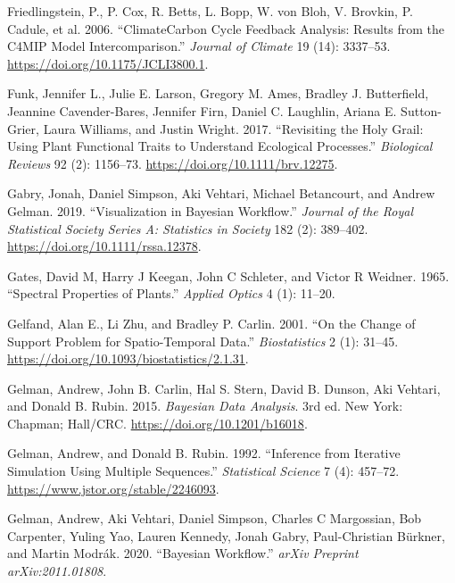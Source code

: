 \documentclass[
  letterpaper,
  DIV=11,
  numbers=noendperiod]{scrartcl}
\newlength{\cslhangindent}
\newlength{\cslentryspacingunit} %
\newenvironment{CSLReferences}[2] %
 {%
  \setlength{\parindent}{0pt}
  \ifodd #1
  \let\oldpar\par
  \def\par{\hangindent=\cslhangindent\oldpar}
  \fi
  \setlength{\parskip}{#2\cslentryspacingunit}
 }%
 {}
\begin{document}
\begin{CSLReferences}{1}{0}
\leavevmode{}%
Friedlingstein, P., P. Cox, R. Betts, L. Bopp, W. von Bloh, V. Brovkin,
P. Cadule, et al. 2006. {``Climate{\textendash}Carbon Cycle Feedback
Analysis: Results from the C4MIP Model Intercomparison.''} \emph{Journal
of Climate} 19 (14): 3337--53. \url{https://doi.org/10.1175/JCLI3800.1}.

\leavevmode{}%
Funk, Jennifer L., Julie E. Larson, Gregory M. Ames, Bradley J.
Butterfield, Jeannine Cavender-Bares, Jennifer Firn, Daniel C. Laughlin,
Ariana E. Sutton-Grier, Laura Williams, and Justin Wright. 2017.
{``Revisiting the Holy Grail: Using Plant Functional Traits to
Understand Ecological Processes.''} \emph{Biological Reviews} 92 (2):
1156--73. \url{https://doi.org/10.1111/brv.12275}.

\leavevmode{}%
Gabry, Jonah, Daniel Simpson, Aki Vehtari, Michael Betancourt, and
Andrew Gelman. 2019. {``Visualization in Bayesian Workflow.''}
\emph{Journal of the Royal Statistical Society Series A: Statistics in
Society} 182 (2): 389--402. \url{https://doi.org/10.1111/rssa.12378}.

\leavevmode{}%
Gates, David M, Harry J Keegan, John C Schleter, and Victor R Weidner.
1965. {``Spectral Properties of Plants.''} \emph{Applied Optics} 4 (1):
11--20.

\leavevmode{}%
Gelfand, Alan E., Li Zhu, and Bradley P. Carlin. 2001. {``On the Change
of Support Problem for Spatio-Temporal Data.''} \emph{Biostatistics} 2
(1): 31--45. \url{https://doi.org/10.1093/biostatistics/2.1.31}.

\leavevmode{}%
Gelman, Andrew, John B. Carlin, Hal S. Stern, David B. Dunson, Aki
Vehtari, and Donald B. Rubin. 2015. \emph{Bayesian Data Analysis}. 3rd
ed. New York: Chapman; Hall/CRC. \url{https://doi.org/10.1201/b16018}.

\leavevmode{}%
Gelman, Andrew, and Donald B. Rubin. 1992. {``Inference from Iterative
Simulation Using Multiple Sequences.''} \emph{Statistical Science} 7
(4): 457--72. \url{https://www.jstor.org/stable/2246093}.

\leavevmode{}%
Gelman, Andrew, Aki Vehtari, Daniel Simpson, Charles C Margossian, Bob
Carpenter, Yuling Yao, Lauren Kennedy, Jonah Gabry, Paul-Christian
Bürkner, and Martin Modrák. 2020. {``Bayesian Workflow.''} \emph{arXiv
Preprint arXiv:2011.01808}.


\end{CSLReferences}
\end{document}
